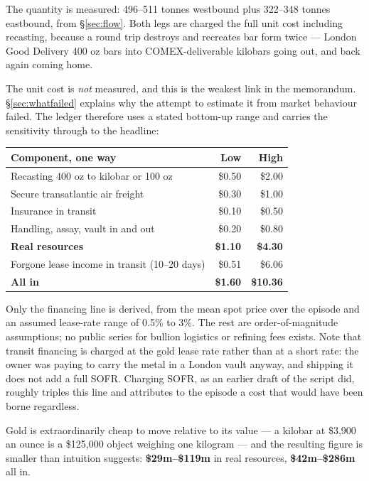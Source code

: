 \documentclass[11pt,a4paper]{article}
\begin{document}
The quantity is measured: 496--511 tonnes westbound plus 322--348 tonnes eastbound, from
\S\ref{sec:flow}. Both legs are charged the full unit cost including recasting, because a round
trip destroys and recreates bar form twice --- London Good Delivery 400 oz bars into
COMEX-deliverable kilobars going out, and back again coming home.

The unit cost is \emph{not} measured, and this is the weakest link in the memorandum.
\S\ref{sec:whatfailed} explains why the attempt to estimate it from market behaviour failed. The
ledger therefore uses a stated bottom-up range and carries the sensitivity through to the
headline:

\begin{center}
\small
\begin{tabular}{@{}lrr@{}}
\toprule
\textbf{Component, one way} & \textbf{Low} & \textbf{High} \\
\midrule
Recasting 400 oz to kilobar or 100 oz & \$0.50 & \$2.00 \\
Secure transatlantic air freight & \$0.30 & \$1.00 \\
Insurance in transit & \$0.10 & \$0.50 \\
Handling, assay, vault in and out & \$0.20 & \$0.80 \\
\midrule
\textbf{Real resources} & \textbf{\$1.10} & \textbf{\$4.30} \\
Forgone lease income in transit (10--20 days) & \$0.51 & \$6.06 \\
\textbf{All in} & \textbf{\$1.60} & \textbf{\$10.36} \\
\bottomrule
\end{tabular}
\end{center}

Only the financing line is derived, from the mean spot price over the episode and an assumed
lease-rate range of 0.5\% to 3\%. The rest are order-of-magnitude assumptions; no public series
for bullion logistics or refining fees exists. Note that transit financing is charged at the
gold lease rate rather than at a short rate: the owner was paying to carry the metal in a London
vault anyway, and shipping it does not add a full SOFR. Charging SOFR, as an earlier draft of the
script did, roughly triples this line and attributes to the episode a cost that would have been
borne regardless.

Gold is extraordinarily cheap to move relative to its value --- a kilobar at \$3,900 an ounce is
a \$125,000 object weighing one kilogram --- and the resulting figure is smaller than intuition
suggests: \textbf{\$29m--\$119m} in real resources, \textbf{\$42m--\$286m} all in.
\end{document}
